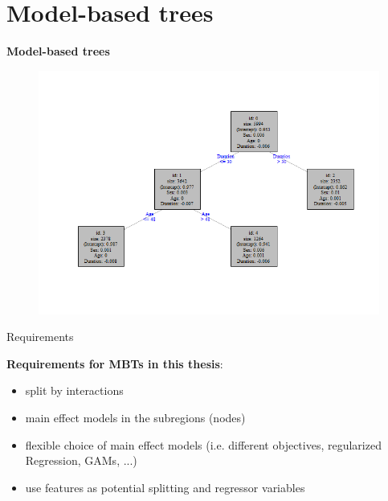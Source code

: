 \documentclass[9pt, xcolor=table]{beamer}
\begin{document}
\section{Model-based trees}
\begin{frame}
\centering
\huge{\textbf{Model-based trees}}
\begin{figure}
    \centering    
    \includegraphics[width=12cm]{Figures/disputation/slim_lm_tree.png}
\end{figure}
\end{frame}

\begin{frame}{Requirements}

\textbf{Requirements for MBTs in this thesis}:
\begin{itemize}
    \item split by interactions
    \item main effect models in the subregions (nodes)
    \item flexible choice of main effect models (i.e. different objectives, regularized Regression, GAMs, ...)
    \item use features as potential splitting and regressor variables
\end{itemize}  
\end{frame}
\end{document}
